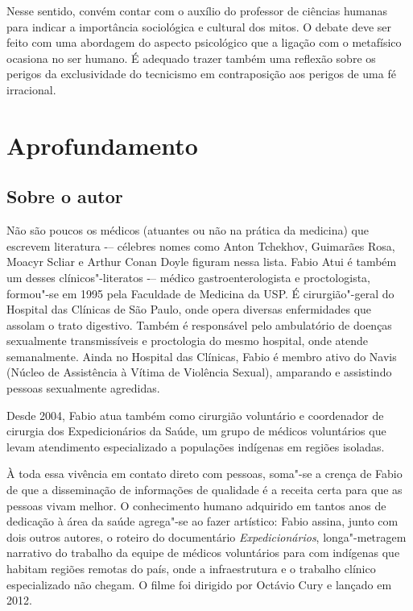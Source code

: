 \documentclass[12pt]{extarticle}
\begin{document}

Nesse sentido, convém contar com o auxílio do professor de ciências
humanas para indicar a importância sociológica e cultural dos mitos. O debate deve ser feito com uma abordagem do aspecto psicológico que a ligação com o metafísico ocasiona no ser humano. É adequado trazer também uma reflexão sobre os perigos
da exclusividade do tecnicismo em contraposição aos perigos de uma fé irracional.

\section{Aprofundamento}


\subsection{Sobre o autor}

Não são poucos os médicos (atuantes ou não na prática da medicina) que escrevem literatura -– célebres nomes como Anton Tchekhov, Guimarães Rosa, Moacyr Scliar e Arthur Conan Doyle figuram nessa lista. Fabio Atui é também um desses clínicos"-literatos -– médico gastroenterologista e proctologista, formou"-se em 1995 pela Faculdade de Medicina da USP. É cirurgião"-geral do Hospital das Clínicas de São Paulo, onde opera diversas enfermidades que assolam o trato digestivo. Também é responsável pelo ambulatório de doenças sexualmente transmissíveis e proctologia do mesmo hospital, onde atende semanalmente. Ainda no Hospital das Clínicas, Fabio é membro ativo do Navis (Núcleo de Assistência à Vítima de Violência Sexual), amparando e assistindo pessoas sexualmente agredidas.

Desde 2004, Fabio atua também como cirurgião voluntário e coordenador de cirurgia dos Expedicionários da Saúde, um grupo de médicos voluntários que levam atendimento especializado a populações indígenas em regiões isoladas. 




À toda essa vivência em contato direto com pessoas, soma"-se a crença de Fabio de que a disseminação de informações de qualidade é a receita certa para que as pessoas vivam melhor. O conhecimento humano adquirido em tantos anos de dedicação à área da saúde agrega"-se ao fazer artístico: Fabio assina, junto com dois outros autores, o roteiro do documentário \emph{Expedicionários}, longa"-metragem narrativo do trabalho da equipe de médicos voluntários para com indígenas que habitam regiões remotas do país, onde a infraestrutura e o trabalho clínico especializado não chegam. O filme foi dirigido por Octávio Cury e lançado em 2012. 
\end{document}

